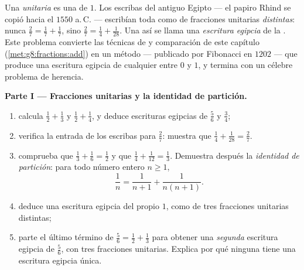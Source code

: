\begin{problem}
\label{pb:g8:fractions:1}
Una \emph{ unitaria} es una  de  $1$. Los
escribas del antiguo Egipto --- el papiro Rhind se copió hacia el
$1550$ a.\,C. --- escribían toda  como  de fracciones
unitarias \emph{distintas}: nunca $\frac27 = \frac17 + \frac17$, sino
$\frac27 = \frac14 + \frac{1}{28}$. Una  así se llama una
\emph{escritura egipcia} de la . Este problema convierte las
técnicas de  y comparación de este capítulo
(\cref{met:g8:fractions:add}) en un método --- publicado por
Fibonacci en $1202$ --- que produce una escritura egipcia de cualquier
 entre $0$ y $1$, y termina con un célebre
problema de herencia.

\medskip
\noindent\textbf{Parte I --- Fracciones unitarias y la identidad de
partición.}
\begin{enumerate}
  \item calcula $\frac12 + \frac13$ y $\frac12 + \frac14$, y
        deduce escrituras egipcias de $\frac56$ y $\frac34$;
  \item verifica la entrada de los escribas para $\frac27$: muestra que
        $\frac14 + \frac{1}{28} = \frac27$.
  \item comprueba que $\frac13 + \frac16 = \frac12$ y que
        $\frac14 + \frac{1}{12} = \frac13$. Demuestra después la
        \emph{identidad de partición}: para todo número entero
        $n \geq 1$,
        \[
        \frac{1}{n} = \frac{1}{n+1} + \frac{1}{n(n+1)} .
        \]
  \item deduce una escritura egipcia del propio $1$, como  de
        tres fracciones unitarias distintas;
  \item parte el último término de $\frac56 = \frac12 + \frac13$ para
        obtener una \emph{segunda} escritura egipcia de $\frac56$, con
        tres fracciones unitarias. Explica por qué ninguna  tiene una
        escritura egipcia única.
\end{enumerate}


\end{problem}
